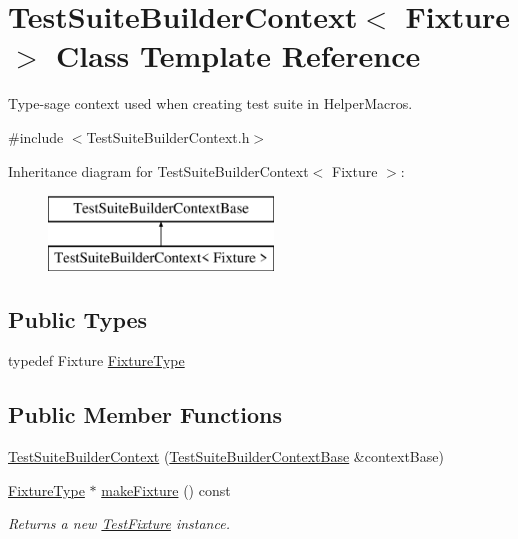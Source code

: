 \hypertarget{class_test_suite_builder_context}{\section{Test\-Suite\-Builder\-Context$<$ Fixture $>$ Class Template Reference}
\label{class_test_suite_builder_context}
}


Type-\/sage context used when creating test suite in Helper\-Macros.  




{\ttfamily \#include $<$Test\-Suite\-Builder\-Context.\-h$>$}

Inheritance diagram for Test\-Suite\-Builder\-Context$<$ Fixture $>$\-:\begin{figure}[H]
\begin{center}
\leavevmode
\includegraphics[height=2.000000cm]{class_test_suite_builder_context}
\end{center}
\end{figure}
\subsection*{Public Types}
\begin{DoxyCompactItemize}
\item 
typedef Fixture \hyperlink{class_test_suite_builder_context_a994528427c211ca187b39a9345ea53ee}{Fixture\-Type}
\end{DoxyCompactItemize}
\subsection*{Public Member Functions}
\begin{DoxyCompactItemize}
\item 
\hyperlink{class_test_suite_builder_context_a51c0c0c846df2790ea1866c61e9b3e39}{Test\-Suite\-Builder\-Context} (\hyperlink{class_test_suite_builder_context_base}{Test\-Suite\-Builder\-Context\-Base} \&context\-Base)
\item 
\hyperlink{class_test_suite_builder_context_a994528427c211ca187b39a9345ea53ee}{Fixture\-Type} $\ast$ \hyperlink{class_test_suite_builder_context_a8f5c2fa277582411aa49bfbbe6d72d11}{make\-Fixture} () const 
\begin{DoxyCompactList}\small\item\em Returns a new \hyperlink{class_test_fixture}{Test\-Fixture} instance. \end{DoxyCompactList}\end{DoxyCompactItemize}
